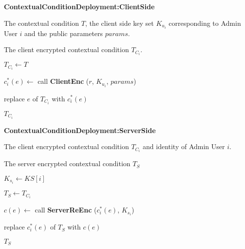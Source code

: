 \documentclass[final,5p,times,twocolumn]{elsarticle}
\newcommand{\algofontsize}{\fontsize{7}{8}\selectfont}
\begin{document}
\begin{algorithm}[htp]
{\algofontsize
\caption{\textbf{ContextualConditionDeployment:ClientSide}}

\label{algo:deploy-contextual-condition-client-side}

\begin{algorithmic}[1]

\REQUIRE The contextual condition $T$, the client side key set $K_{u_i}$ corresponding to Admin User $i$ and the public parameters $params$.

\ENSURE The client encrypted contextual condition $T_{C_i}$.

\medskip

\STATE $T_{C_i} \leftarrow T$ \label{line:deploy-cc-cs-copy}

 \label{line:deploy-cc-cs-loop}

	\STATE $c^*_i (e) \leftarrow$ call \textbf{ClientEnc} ($r$, $K_{u_i}$, $params$) \label{line:deploy-cc-cs-call}
	
	\STATE replace $e$ of $T_{C_i}$ with $c^*_i (e)$ \label{line:deploy-cc-cs-replace}

\ENDFOR

\RETURN $T_{C_i}$

\end{algorithmic}
}
\end{algorithm}




\begin{algorithm}[htp]
{\algofontsize
\caption{\textbf{ContextualConditionDeployment:ServerSide}}

\label{algo:deploy-contextual-condition-server-side}

\begin{algorithmic}[1]

\REQUIRE The client encrypted contextual condition $T_{C_i}$ and identity of Admin User $i$.

\ENSURE The server encrypted contextual condition $T_{S}$

\medskip

\STATE $K_{s_i} \leftarrow KS[i]$ {\algofontsize {}} \label{line:deploy-cc-ss-ks}

\STATE $T_{S} \leftarrow T_{C_i}$ \label{line:deploy-cc-ss-copy}

 \label{line:deploy-cc-ss-loop}

	\STATE $c(e) \leftarrow$ call \textbf{ServerReEnc} ($c^*_i (e)$, $K_{s_i}$) \label{line:deploy-cc-ss-call}
	
	\STATE replace $c^*_i (e)$ of $T_{S}$ with $c(e)$ \label{line:deploy-cc-ss-replace}

\ENDFOR

\RETURN $T_{S}$

\end{algorithmic}
}
\end{algorithm}
\end{document}
